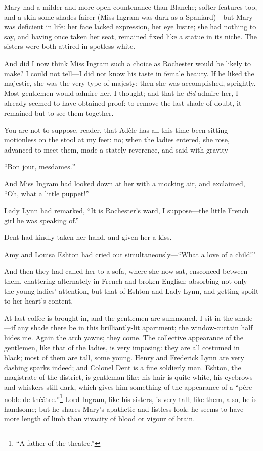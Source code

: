 Mary had a milder and more open countenance than Blanche; softer
features too, and a skin some shades fairer (Miss Ingram was dark as a
Spaniard)---but Mary was deficient in life: her face lacked expression,
her eye lustre; she had nothing to say, and having once taken her seat,
remained fixed like a statue in its niche. The sisters were both
attired in spotless white.

And did I now think Miss Ingram such a choice as \Mr{} Rochester would be
likely to make? I could not tell---I did not know his taste in female
beauty. If he liked the majestic, she was the very type of majesty:
then she was accomplished, sprightly. Most gentlemen would admire her,
I thought; and that he \emph{did} admire her, I already seemed to have
obtained proof: to remove the last shade of doubt, it remained but to
see them together.

You are not to suppose, reader, that Adèle has all this time been
sitting motionless on the stool at my feet: no; when the ladies entered,
she rose, advanced to meet them, made a stately reverence, and said with
gravity---

\foreignquote{french}{Bon jour, mesdames.}

And Miss Ingram had looked down at her with a mocking air, and
exclaimed, \enquote{Oh, what a little puppet!}

Lady Lynn had remarked, \enquote{It is \Mr{} Rochester's ward, I
suppose---the little French girl he was speaking of.}

\Mrs{} Dent had kindly taken her hand, and given her a kiss.

Amy and Louisa Eshton had cried out simultaneously---\enquote{What a
love of a child!}

And then they had called her to a sofa, where she now sat, ensconced
between them, chattering alternately in French and broken English;
absorbing not only the young ladies' attention, but that of \Mrs{} Eshton
and Lady Lynn, and getting spoilt to her heart's content.

At last coffee is brought in, and the gentlemen are summoned. I sit in
the shade---if any shade there be in this brilliantly-lit apartment; the
window-curtain half hides me. Again the arch yawns; they come. The
collective appearance of the gentlemen, like that of the ladies, is very
imposing: they are all costumed in black; most of them are tall, some
young. Henry and Frederick Lynn are very dashing sparks indeed; and
Colonel Dent is a fine soldierly man. \Mr{} Eshton, the magistrate of the
district, is gentleman-like: his hair is quite white, his eyebrows and
whiskers still dark, which gives him something of the appearance of a
\foreignquote{french}{père noble de théâtre.}\footnote{
	\enquote{A father of the theatre.}} Lord Ingram, like his sisters, is very
tall; like them, also, he is handsome; but he shares Mary's apathetic
and listless look: he seems to have more length of limb than vivacity of
blood or vigour of brain.

